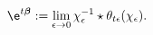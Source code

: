 \begin{equation}
 \e^{t\boldsymbol\beta}:=\lim_{\epsilon\rightarrow 0} \chi_{\epsilon}^{-1}\star \theta_{t\epsilon}(\chi_{\epsilon}).\label{z.2}
\end{equation} 

